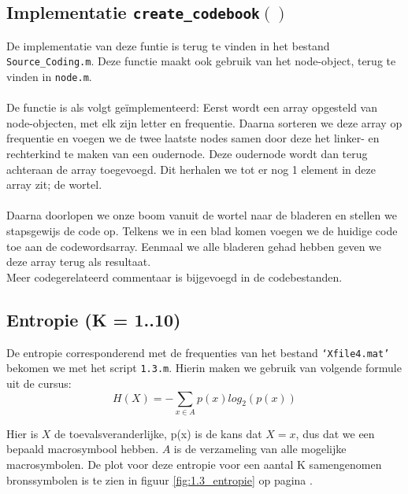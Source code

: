 \documentclass[11pt,a4paper]{article}
\begin{document}
\subsection{Implementatie \texttt{create\_codebook$\left(\right)$}}

De implementatie van deze funtie is terug te vinden in het bestand \texttt{Source\_Coding.m}. Deze functie maakt ook gebruik van het node-object, terug te vinden in \texttt{node.m}.\\\\
De functie is als volgt ge\"implementeerd: Eerst wordt een array opgesteld van node-objecten, met elk zijn letter en frequentie. Daarna sorteren we deze array op frequentie en voegen we de twee laatste nodes samen door deze het linker- en rechterkind te maken van een oudernode. Deze oudernode wordt dan terug achteraan de array toegevoegd. Dit herhalen we tot er nog 1 element in deze array zit; de wortel.\\\\
Daarna doorlopen we onze boom vanuit de wortel naar de bladeren en stellen we stapsgewijs de code op. Telkens we in een blad komen voegen we de huidige code toe aan de codewordsarray. Eenmaal we alle bladeren gehad hebben geven we deze array terug als resultaat.\\
Meer codegerelateerd commentaar is bijgevoegd in de codebestanden.

\subsection{Entropie (K = 1..10)}

De entropie corresponderend met de frequenties van het bestand \texttt{`Xfile4.mat'} bekomen we met het script \texttt{1.3.m}. Hierin maken we gebruik van volgende formule uit de cursus:
\begin{equation}
H(X)=-\sum_{x \in A} p(x) log_2(p(x))
\end{equation}

Hier is $X$ de toevalsveranderlijke, p(x) is de kans dat $X=x$, dus dat we een bepaald macrosymbool hebben. $A$ is de verzameling van alle mogelijke macrosymbolen. De plot voor deze entropie voor een aantal K samengenomen bronssymbolen is te zien in figuur \ref{fig:1.3_entropie} op pagina \pageref{fig:1.3_entropie}.\\
\end{document}
